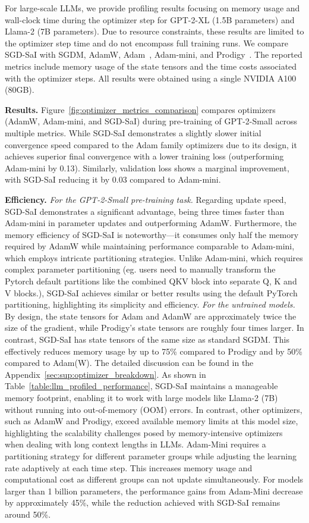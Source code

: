For large-scale LLMs, we provide profiling results focusing on memory usage and wall-clock time during the optimizer step for GPT-2-XL (1.5B parameters) and Llama-2 (7B parameters). Due to resource constraints, these results are limited to the optimizer step time and do not encompass full training runs.
We compare SGD-SaI with SGDM, AdamW, Adam~\cite{kingma2014adam}, Adam-mini, and Prodigy~\cite{mishchenko2023prodigy}.
The reported metrics include memory usage of the state tensors and the time costs associated with the optimizer steps. All results were obtained using a single NVIDIA A100 (80GB).


\textbf{Results.} 
Figure~\ref{fig:optimizer_metrics_comparison} compares optimizers (AdamW, Adam-mini, and SGD-SaI) during pre-training of GPT-2-Small across multiple metrics. While SGD-SaI demonstrates a slightly slower initial convergence speed compared to the Adam family optimizers due to its design, it achieves superior final convergence with a lower training loss (outperforming Adam-mini by 0.13). Similarly, validation loss shows a marginal improvement, with SGD-SaI reducing it by 0.03 compared to Adam-mini.

\textbf{Efficiency.}
\textit{For the GPT-2-Small pre-training task.} Regarding update speed, SGD-SaI demonstrates a significant advantage, being three times faster than Adam-mini in parameter updates and outperforming AdamW. Furthermore, the memory efficiency of SGD-SaI is noteworthy—it consumes only half the memory required by AdamW while maintaining performance comparable to Adam-mini, which employs intricate partitioning strategies. Unlike Adam-mini, which requires complex parameter partitioning (eg. users need to manually transform the Pytorch default partitions like the combined QKV block into separate Q, K and V blocks.), SGD-SaI achieves similar or better results using the default PyTorch partitioning, highlighting its simplicity and efficiency.
\textit{For the untrained models.} By design, the state tensors for Adam and AdamW are approximately twice the size of the gradient, while Prodigy’s state tensors are roughly four times larger. In contrast, SGD-SaI has state tensors of the same size as standard SGDM. This effectively reduces memory usage by up to 75\% compared to Prodigy and by 50\% compared to Adam(W). The detailed discussion can be found in the Appendix~\ref{sec:sup:optimizer_breakdown}. As shown in Table~\ref{table:llm_profiled_performance}, SGD-SaI maintains a manageable memory footprint, enabling it to work with large models like Llama-2 (7B) without running into out-of-memory (OOM) errors. In contrast, other optimizers, such as AdamW and Prodigy, exceed available memory limits at this model size, highlighting the scalability challenges posed by memory-intensive optimizers when dealing with long context lengths in LLMs.
Adam-Mini requires a partitioning strategy for different parameter groups while adjusting the learning rate adaptively at each time step. This increases memory usage and computational cost as different groups can not update simultaneously. For models larger than 1 billion parameters, the performance gains from Adam-Mini decrease by approximately 45\%, while the reduction achieved with SGD-SaI remains around 50\%.


